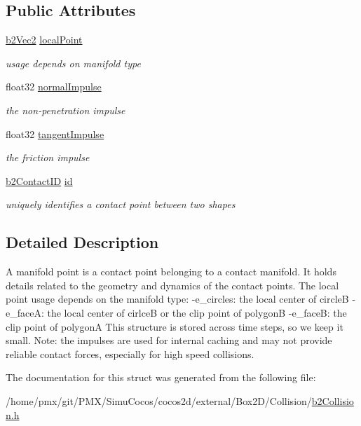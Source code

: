 \subsection*{Public Attributes}
\begin{DoxyCompactItemize}
\item 
\mbox{\label{structb2ManifoldPoint_ab3616990e7d1644deeeb691246094bfa}} 
\hyperlink{structb2Vec2}{b2\+Vec2} \hyperlink{structb2ManifoldPoint_ab3616990e7d1644deeeb691246094bfa}{local\+Point}
\begin{DoxyCompactList}\small\item\em usage depends on manifold type \end{DoxyCompactList}\item 
\mbox{\label{structb2ManifoldPoint_af4218c2359cb7762cd4e9d8ecefab173}} 
float32 \hyperlink{structb2ManifoldPoint_af4218c2359cb7762cd4e9d8ecefab173}{normal\+Impulse}
\begin{DoxyCompactList}\small\item\em the non-\/penetration impulse \end{DoxyCompactList}\item 
\mbox{\label{structb2ManifoldPoint_a0ac5375b1fc4675a0073129f56aa62c9}} 
float32 \hyperlink{structb2ManifoldPoint_a0ac5375b1fc4675a0073129f56aa62c9}{tangent\+Impulse}
\begin{DoxyCompactList}\small\item\em the friction impulse \end{DoxyCompactList}\item 
\mbox{\label{structb2ManifoldPoint_afa7ec272b2b27abe129540f8fbe57fc5}} 
\hyperlink{unionb2ContactID}{b2\+Contact\+ID} \hyperlink{structb2ManifoldPoint_afa7ec272b2b27abe129540f8fbe57fc5}{id}
\begin{DoxyCompactList}\small\item\em uniquely identifies a contact point between two shapes \end{DoxyCompactList}\end{DoxyCompactItemize}


\subsection{Detailed Description}
A manifold point is a contact point belonging to a contact manifold. It holds details related to the geometry and dynamics of the contact points. The local point usage depends on the manifold type\+: -\/e\+\_\+circles\+: the local center of circleB -\/e\+\_\+faceA\+: the local center of cirlceB or the clip point of polygonB -\/e\+\_\+faceB\+: the clip point of polygonA This structure is stored across time steps, so we keep it small. Note\+: the impulses are used for internal caching and may not provide reliable contact forces, especially for high speed collisions. 

The documentation for this struct was generated from the following file\+:\begin{DoxyCompactItemize}
\item 
/home/pmx/git/\+P\+M\+X/\+Simu\+Cocos/cocos2d/external/\+Box2\+D/\+Collision/\hyperlink{cocos2d_2external_2Box2D_2Collision_2b2Collision_8h}{b2\+Collision.\+h}\end{DoxyCompactItemize}

